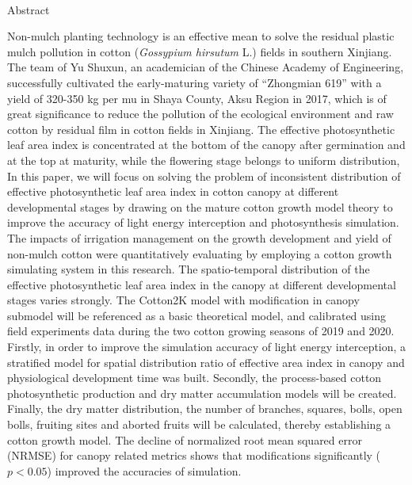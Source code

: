 \begin{doublespace}
    \begin{center}
    \textrm{\textbf{\titleEN}\\
    Abstract}
    \end{center}
\end{doublespace}
\begin{spacing}{} 
Non-mulch planting technology is an effective mean to solve the residual plastic mulch pollution in cotton (\textit{Gossypium hirsutum} L.) fields in southern Xinjiang.
The team of Yu Shuxun, an academician of the Chinese Academy of Engineering, successfully cultivated the early-maturing variety of ``Zhongmian 619'' with a yield of 320{-}350 kg per mu in Shaya County, Aksu Region in 2017,
which is of great significance to reduce the pollution of the ecological environment and raw cotton by residual film in cotton fields in Xinjiang. %
The effective photosynthetic leaf area index is concentrated at the bottom of the canopy after germination and at the top at maturity, while the flowering stage belongs to uniform distribution, %
In this paper, we will focus on solving the problem of inconsistent distribution of effective photosynthetic leaf area index in cotton canopy at different developmental stages by drawing on the mature cotton growth model theory to improve the accuracy of light energy interception and photosynthesis simulation.
The impacts of irrigation management on the growth development and yield of non-mulch cotton were quantitatively evaluating by employing a cotton growth simulating system in this research.
The spatio-temporal distribution of the effective photosynthetic leaf area index in the canopy at different developmental stages varies strongly.
The Cotton2K model with modification in canopy submodel will be referenced as a basic theoretical model, and calibrated using field experiments data during the two cotton growing seasons of 2019 and 2020.
Firstly, in order to improve the simulation accuracy of light energy interception, a stratified model for spatial distribution ratio of effective area index in canopy and physiological development time was built.
Secondly, the process-based cotton photosynthetic production and dry matter accumulation models will be created.
Finally, the dry matter distribution, the number of branches, squares, bolls, open bolls, fruiting sites and aborted fruits will be calculated, thereby establishing a cotton growth model.
The decline of normalized root mean squared error (NRMSE) for canopy related metrics shows that modifications significantly ($p < 0.05$) improved the accuracies of simulation.


\end{spacing}
